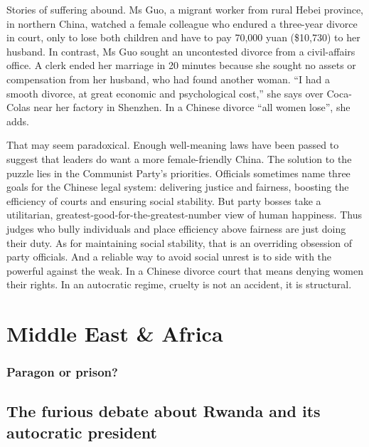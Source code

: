 \documentclass{article}
\begin{document}
Stories of suffering abound. Ms Guo, a migrant worker from rural Hebei province, in northern China, watched a female colleague who endured a three-year divorce in court, only to lose both children and have to pay 70,000 yuan (\$10,730) to her husband. In contrast, Ms Guo sought an uncontested divorce from a civil-affairs office. A clerk ended her marriage in 20 minutes because she sought no assets or compensation from her husband, who had found another woman. ``I had a smooth divorce, at great economic and psychological cost,'' she says over Coca-Colas near her factory in Shenzhen. In a Chinese divorce ``all women lose'', she adds. 

That may seem paradoxical. Enough well-meaning laws have been passed to suggest that leaders do want a more female-friendly China. The solution to the puzzle lies in the Communist Party's priorities. Officials sometimes name three goals for the Chinese legal system: delivering justice and fairness, boosting the efficiency of courts and ensuring social stability. But party bosses take a utilitarian, greatest-good-for-the-greatest-number view of human happiness. Thus judges who bully individuals and place efficiency above fairness are just doing their duty. As for maintaining social stability, that is an overriding obsession of party officials. And a reliable way to avoid social unrest is to side with the powerful against the weak. In a Chinese divorce court that means denying women their rights. In an autocratic regime, cruelty is not an accident, it is structural. {} 
\clearpage
\section{Middle East \& Africa }
\subsubsection{Paragon or prison? }
\subsection{The furious debate about Rwanda and its autocratic president }
\end{document}
